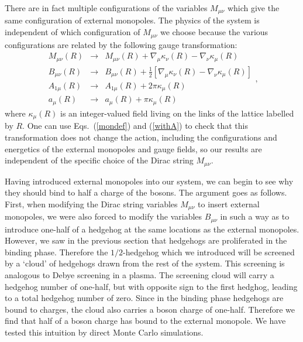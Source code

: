 \documentclass[prb,twocolumn]{revtex4-1}
\begin{document}
There are in fact multiple configurations of the variables $M_{\mu\nu}$ which give the same configuration of external monopoles. The physics of the system is independent of which configuration of $M_{\mu\nu}$ we choose because the various configurations are related by the following gauge transformation:
\begin{equation}
\begin{array}{ccc}
M_{\mu\nu}(R)&\rightarrow&M_{\mu\nu}(R)+\nabla_\mu \kappa_\nu(R)-\nabla_\nu \kappa_\mu(R) \\
B_{\mu\nu}(R)&\rightarrow&B_{\mu\nu}(R)+\frac{1}{2}[\nabla_\mu \kappa_\nu(R)-\nabla_\nu \kappa_\mu(R)] \\
A_{1\mu}(R)&\rightarrow&A_{1\mu}(R)+2\pi \kappa_\mu(R)\\
a_\mu(R)&\rightarrow&a_\mu(R)+\pi \kappa_\mu(R)
\end{array},
\end{equation}
where $\kappa_\mu(R)$ is an integer-valued field living on the links of the lattice labelled by $R$. One can use Eqs.~(\ref{mondef}) and (\ref{withA}) to check that this transformation does not change the action, %
including the configurations and energetics of the external monopoles and gauge fields, so our results are independent of the specific choice of the Dirac string $M_{\mu\nu}$. 

Having introduced external monopoles into our system, we can begin to see why they should bind to half a charge of the bosons. 
The argument goes as follows. First, when modifying the Dirac string variables $M_{\mu\nu}$ to insert external monopoles, we were also forced to modify the variables $B_{\mu\nu}$ in such a way as to introduce one-half of a hedgehog at the same locations as the external monopoles. However, we saw in the previous section that hedgehogs are proliferated in the binding phase. Therefore the $1/2$-hedgehog which we introduced will be screened by a `cloud' of hedgehogs drawn from the rest of the system. This screening is analogous to Debye screening in a plasma. The screening cloud will carry a hedgehog number of one-half, but with opposite sign to the first hedghog, leading to a total hedgehog number of zero. Since in the binding phase hedgehogs are bound to charges, the cloud also carries a boson charge of one-half. Therefore we find that half of a boson charge has bound to the external monopole. We have tested this intuition by direct Monte Carlo simulations.
\end{document}
